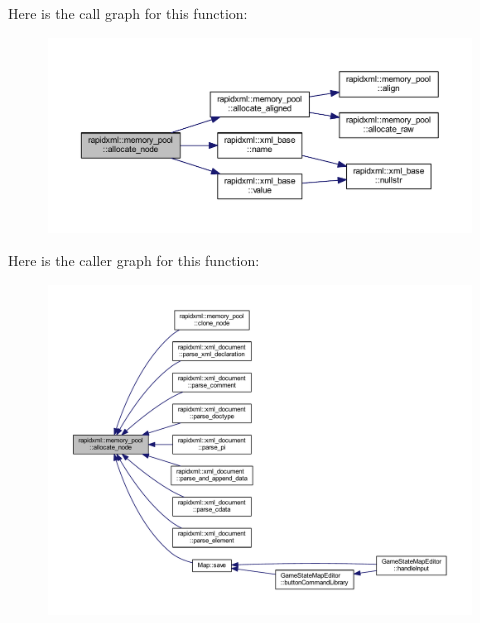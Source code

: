 Here is the call graph for this function\+:\nopagebreak
\begin{figure}[H]
\begin{center}
\leavevmode
\includegraphics[width=350pt]{classrapidxml_1_1memory__pool_a4118581c29ee9a2f6b55ebf7dac185f8_cgraph}
\end{center}
\end{figure}




Here is the caller graph for this function\+:\nopagebreak
\begin{figure}[H]
\begin{center}
\leavevmode
\includegraphics[width=350pt]{classrapidxml_1_1memory__pool_a4118581c29ee9a2f6b55ebf7dac185f8_icgraph}
\end{center}
\end{figure}


